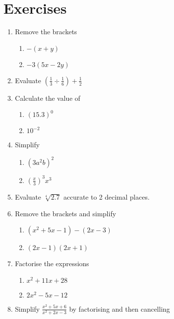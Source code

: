  
 
 
 
\section{Exercises} 
 
\begin{enumerate}
	\item Remove the brackets 
	\begin{enumerate}
		\item $ -\left (x +y\right )$ 
		\item $ -3 (5 x -2 y)$ \end{enumerate}
	
	\item Evaluate $\left (\frac{1}{3} \div \frac{1}{6}\right ) +\frac{1}{2}$ 
	
	\item Calculate the value of 
	\begin{enumerate}
		\item $\left (15.3\right )^{0}$ 
		\item $10^{ -2}$ \end{enumerate}
	\item Simplify 
	\begin{enumerate}
		\item $\left (3 a^{2} b\right )^{2}$ 
		
		\item $\genfrac{(}{)}{}{}{x}{3}^{3} x^{3}$ \end{enumerate}
	
	
	\item Evaluate $\sqrt[{4}]{2.7}$ accurate to 2 decimal places. 
	
	\item Remove the brackets and simplify 
	
	
	\begin{enumerate}
		\item $\left (x^{2} +5 x -1\right ) -\left (2 x -3\right )$ 
		
		\item $\left (2 x -1\right ) \left (2 x +1\right )$ \end{enumerate}
	
	
	\item Factorise the expressions 
	\begin{enumerate}
		\item $x^{2} +11 x +28$ 	
		\item $2 x^{2} -5 x -12$ 
		\end{enumerate}
	\item Simplify $\frac{x^{2} +5 x +6}{x^{2} +2 x -3}$ by factorising and then cancelling 
	

\end{enumerate}
